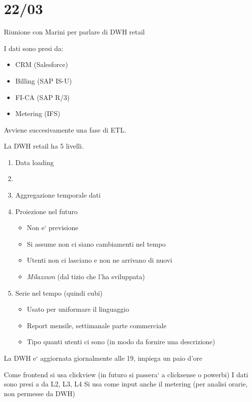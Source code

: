 \section{22/03}
    Riunione con Marini per parlare di DWH retail
    
    I dati sono presi da:
    \begin{itemize}
        \item CRM (Salesforce)
        \item Billing (SAP IS-U)
        \item FI-CA (SAP R/3)
        \item Metering (IFS)
    \end{itemize}
    
    Avviene succesivamente una fase di ETL.
    
    La DWH retail ha 5 livelli.
    \begin{enumerate}
        \item Data loading
        \item
        \item Aggregazione temporale dati
        \item Proiezione nel futuro
            \begin{itemize}
                \item Non e` previsione
                \item Si assume non ci siano cambiamenti nel tempo
                \item Utenti non ci lasciano e non ne arrivano di nuovi
                \item \textit{Milazzum} (dal tizio che l'ha sviluppata)
            \end{itemize}
        \item Serie nel tempo (quindi cubi)
            \begin{itemize}
                \item Usato per uniformare il linguaggio
                \item Report mensile, settimanale parte commerciale
                \item Tipo quanti utenti ci sono (in modo da fornire una descrizione)
            \end{itemize}
    \end{enumerate}
    
    La DWH e` aggiornata giornalmente alle 19, impiega un paio d’ore

    Come frontend si usa clickview (in futuro si passera` a clicksense o powerbi)
	I dati sono presi a da L2, L3, L4
	Si usa come input anche il metering (per analisi orarie, non permesse da DWH)

